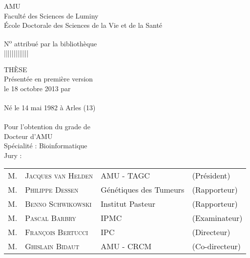\thispagestyle{empty}
  \begin{center}
    \avantgarLarge \acl{AMU}\\[1ex]
    \avantgar Faculté des Sciences de Luminy\\[1ex]
    \avantgar École Doctorale des Sciences de la Vie et de la Santé\\[3ex]
  \end{center}

  \begin{flushright}
    \avantgar N\textsuperscript{o} attribué par la bibliothèque\\[1ex]
    \avantgar |\textunderscore|\textunderscore|\textunderscore|\textunderscore|\textunderscore|\textunderscore|\textunderscore|\textunderscore|\textunderscore|\textunderscore|\textunderscore|\textunderscore|\\[1ex]
  \end{flushright}

  \begin{center}
    \avantgarboldHuge THÈSE\\[1.5ex]

    \avantgarlarge Présentée en première version\\[1ex]
    \avantgarlarge le 18 octobre 2013 par\\[1ex]
    \avantgarLarge \myauthor\\[1ex]
    \avantgar Né le 14 mai 1982 à Arles (13)\\[5ex]

    \avantgarboldHuge \mytitlefr\\[2ex]

    \avantgarlarge Pour l'obtention du grade de\\[1ex]
    \avantgarLarge Docteur d'\acl{AMU}\\[1ex]
    \avantgarlarge Spécialité : Bioinformatique\\[5ex]

    \avantgarlarge Jury :\\[1ex]
    \begin{tabular}{llll}
      {\Large M.} & {\Large\textsc{Jacques van Helden}}  & {\large \acs{AMU} - \acs{TAGC}}  & {\large(Président)}   \\
      {\Large M.} & {\Large\textsc{Philippe Dessen}}     & {\large Génétiques des Tumeurs}  & {\large(Rapporteur)}  \\
      {\Large M.} & {\Large\textsc{Benno Schwikowski}}   & {\large Institut Pasteur}        & {\large(Rapporteur)}  \\
      {\Large M.} & {\Large\textsc{Pascal Barbry}}       & {\large \acs{IPMC}}              & {\large(Examinateur)} \\
      {\Large M.} & {\Large\textsc{François Bertucci}}   & {\large \acs{IPC}}               & {\large(Directeur)}   \\
      {\Large M.} & {\Large\textsc{Ghislain Bidaut}}     & {\large \acs{AMU} - \acs{CRCM}}  & {\large(Co-directeur)} \\
    \end{tabular}
  \end{center}